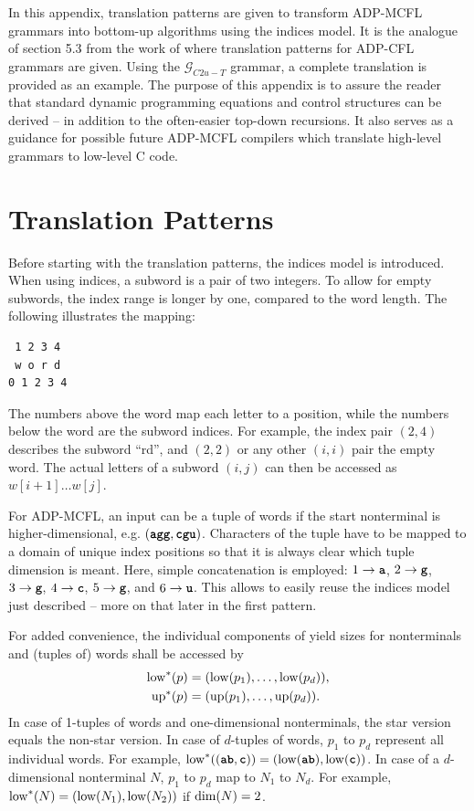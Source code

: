 \documentclass[
    a4paper,
    12pt,
    twoside,
    BCOR=12mm,
    parskip=half,
    chapterprefix,
    numbers=noenddot,
    bibliography=totoc
]{scrbook}
\begin{document}
In this appendix, translation patterns are given to transform ADP-MCFL grammars into bottom-up algorithms using the indices model. It is the analogue of section 5.3 from the work of \citet{giegerich_discipline_2004} where translation patterns for ADP-CFL grammars are given. Using the $\mathcal{G}_{C2u-T}$ grammar, a complete translation is provided as an example. The purpose of this appendix is to assure the reader that standard dynamic programming equations and control structures can be derived -- in addition to the often-easier top-down recursions. It also serves as a guidance for possible future ADP-MCFL compilers which translate high-level grammars to low-level C code.

\section{Translation Patterns}

Before starting with the translation patterns, the indices model is introduced. When using indices, a subword is a pair of two integers. To allow for empty subwords, the index range is longer by one, compared to the word length. The following illustrates the mapping:

\begin{center}
\begin{BVerbatim}
 1 2 3 4
 w o r d
0 1 2 3 4
\end{BVerbatim}
\end{center}

The numbers above the word map each letter to a position, while the numbers below the word are the subword indices. For example, the index pair $(2,4)$ describes the subword ``rd'', and $(2,2)$ or any other $(i,i)$ pair the empty word. The actual letters of a subword $(i,j)$ can then be accessed as $w[i+1] \ldots w[j]$.

For ADP-MCFL, an input can be a tuple of words if the start nonterminal is higher-dimensional, e.g. $(\ts{agg},\ts{cgu})$. Characters of the tuple have to be mapped to a domain of unique index positions so that it is always clear which tuple dimension is meant. Here, simple concatenation is employed: $1 \to \ts{a}$, $2 \to \ts{g}$, $3 \to \ts{g}$, $4 \to \ts{c}$, $5 \to \ts{g}$, and $6 \to \ts{u}$. This allows to easily reuse the indices model just described -- more on that later in the first pattern.

For added convenience, the individual components of yield sizes for nonterminals and (tuples of) words shall be accessed by
\begin{align*}
	\mathrm{low}^*(p) &= (\mathrm{low}(p_1),\ldots,\mathrm{low}(p_d)),\\
	\mathrm{up}^*(p) &= (\mathrm{up}(p_1),\ldots,\mathrm{up}(p_d)).
\end{align*}
In case of 1-tuples of words and one-dimensional nonterminals, the star version equals the non-star version. In case of $d$-tuples of words, $p_1$ to $p_d$ represent all individual words. For example, $\op{low}^*((\ts{ab},\ts{c}))=(\op{low}(\ts{ab}),\op{low}(\ts{c}))$. In case of a $d$-dimensional nonterminal $N$, $p_1$ to $p_d$ map to $N_1$ to $N_d$. For example, $\mathrm{low}^*(N)=(\mathrm{low}(N_1),\mathrm{low}(N_2))$ if $\mathrm{dim}(N)=2$.
\end{document}

